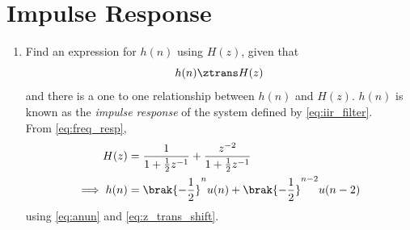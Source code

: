 \documentclass[journal,12pt,twocolumn]{IEEEtran}
\renewcommand\thesection{\arabic{section}}
\begin{document}
\section{Impulse Response}
\begin{enumerate}[label=\thesection.\arabic*]
\item \label{prob:impulse_resp}
Find an expression for $h(n)$ using $H(z)$, given that 
\begin{equation}
\label{eq:impulse_resp}
h(n) \ztrans H(z)
\end{equation}
and there is a one to one relationship between $h(n)$ and $H(z)$. $h(n)$ is known as the {\em impulse response} of the
system defined by \eqref{eq:iir_filter}.
\\
\solution From \eqref{eq:freq_resp},
\begin{align}
H(z) &= \frac{1}{1 + \frac{1}{2}z^{-1}} + \frac{ z^{-2}}{1 + \frac{1}{2}z^{-1}}
\\
\implies h(n) &= \brak{-\frac{1}{2}}^{n}u(n) + \brak{-\frac{1}{2}}^{n-2}u(n-2)
\end{align}
using \eqref{eq:anun} and \eqref{eq:z_trans_shift}.


\end{enumerate}
\end{document}
